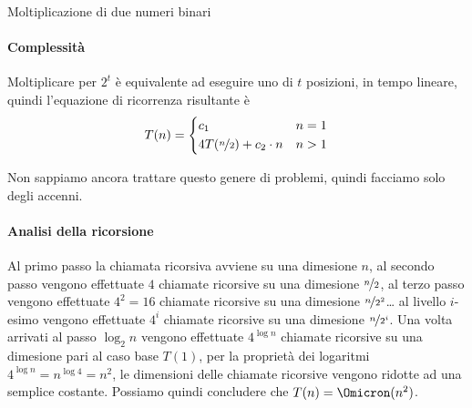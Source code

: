\begin{algorithm}[H]
\caption{Moltiplicazione di due numeri binari}

\BlankLine
\end{algorithm}

\paragraph{Complessità}
Moltiplicare per \(2^t\) è equivalente ad eseguire uno  di \(t\) posizioni, in tempo lineare, quindi l'equazione di ricorrenza risultante è
\[
	T(n) =
	\begin{dcases}
		c_1                               & n = 1 \\
		4T(\nicefrac{n}{2}) + c_2 \cdot n & n > 1 \\
	\end{dcases}
\]

\begin{note}
Non sappiamo ancora trattare questo genere di problemi, quindi facciamo solo degli accenni.
\end{note}

\paragraph{Analisi della ricorsione}
Al primo passo la chiamata ricorsiva avviene su una dimesione \(n\), al secondo passo vengono effettuate \(4\) chiamate ricorsive su una dimesione \(\nicefrac{n}{2}\), al terzo passo vengono effettuate \(4^2 = 16\) chiamate ricorsive su una dimesione \(\nicefrac{n}{2^2}\)\dots
al livello \(i\)-esimo vengono effettuate \(4^i\) chiamate ricorsive su una dimesione \(\nicefrac{n}{2^i}\).
Una volta arrivati al passo \(\log_2 n\) vengono effettuate \(4^{\log n}\) chiamate ricorsive su una dimesione pari al caso base \(T(1)\), per la proprietà dei logaritmi \(4^{\log n} = n^{\log 4} = n^2\), le dimensioni delle chiamate ricorsive vengono ridotte ad una semplice costante.
Possiamo quindi concludere che \(T(n) = \Omicron(n^2)\).

